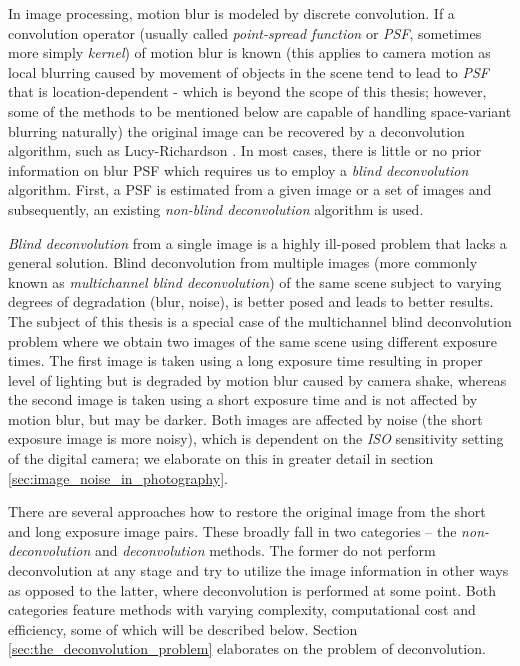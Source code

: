 \documentclass[12pt,notitlepage]{report}
\begin{document}
In image processing, motion blur is modeled by discrete convolution. If a convolution operator (usually called {\em point-spread function} or {\em PSF}, sometimes more simply {\em kernel}) of motion blur is known (this applies to camera motion as local blurring caused by movement of objects in the scene tend to lead to {\em PSF} that is location-dependent - which is beyond the scope of this thesis; however, some of the methods to be mentioned below are capable of handling space-variant blurring naturally) the original image can be recovered by a deconvolution algorithm, such as Lucy-Richardson \cite{rich72}. In most cases, there is little or no prior information on blur PSF which requires us to employ a {\em blind deconvolution} algorithm. First, a PSF is estimated from a given image or a set of images and subsequently, an existing {\em non-blind deconvolution} algorithm is used. 

{\em Blind deconvolution} from a single image is a highly ill-posed problem that lacks a general solution. Blind deconvolution from multiple images (more commonly known as {\em multichannel blind deconvolution}) of the same scene subject to varying degrees of degradation (blur, noise), is better posed and leads to better results. The subject of this thesis is a special case of the multichannel blind deconvolution problem where we obtain two images of the same scene using different exposure times. The first image is taken using a long exposure time resulting in proper level of lighting but is degraded by motion blur caused by camera shake, whereas the second image is taken using a short exposure time and is not affected by motion blur, but may be darker.  Both images are affected by noise (the short exposure image is more noisy), which is dependent on the {\em ISO} sensitivity setting of the digital camera; we elaborate on this in greater detail in section \ref{sec:image_noise_in_photography}. 

There are several approaches how to restore the original image from the short and long exposure image pairs. These broadly fall in two categories – the {\em non-deconvolution} and {\em deconvolution} methods. The former do not perform deconvolution at any stage and try to utilize the image information in other ways as opposed to the latter, where deconvolution is performed at some point. Both categories feature methods with varying complexity, computational cost and efficiency, some of which will be described below. Section \ref{sec:the_deconvolution_problem} elaborates on the problem of deconvolution. 
\end{document}
